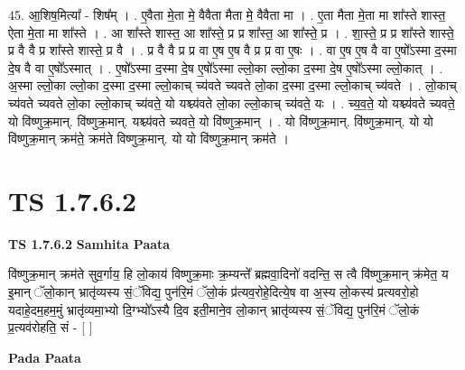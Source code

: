 \documentclass[17pt]{extarticle}
\begin{document}
45. आ॒शिष॒मित्या᳚ - शिष᳚म् । . ए॒वैता मे॒ता मे॒ वैवैता मैता मे॒ वैवैता मा । . ए॒ता मैता मे॒ता मा शा᳚स्ते शास्त॒ ऐता मे॒ता मा शा᳚स्ते । . आ शा᳚स्ते शास्त॒ आ शा᳚स्ते॒ प्र प्र शा᳚स्त॒ आ शा᳚स्ते॒ प्र । . शा॒स्ते॒ प्र प्र शा᳚स्ते शास्ते॒ प्र वै वै प्र शा᳚स्ते शास्ते॒ प्र वै । . प्र वै वै प्र प्र वा ए॒ष ए॒ष वै प्र प्र वा ए॒षः । . वा ए॒ष ए॒ष वै वा ए॒षो᳚ऽस्मा द॒स्मा दे॒ष वै वा ए॒षो᳚ऽस्मात् । . ए॒षो᳚ऽस्मा द॒स्मा दे॒ष ए॒षो᳚ऽस्मा ल्लो॒का ल्लो॒का द॒स्मा दे॒ष ए॒षो᳚ऽस्मा ल्लो॒कात् । . अ॒स्मा ल्लो॒का ल्लो॒का द॒स्मा द॒स्मा ल्लो॒काच् च्य॑वते च्यवते लो॒का द॒स्मा द॒स्मा ल्लो॒काच् च्य॑वते । . लो॒काच् च्य॑वते च्यवते लो॒का ल्लो॒काच् च्य॑वते॒ यो यश्च्य॑वते लो॒का ल्लो॒काच् च्य॑वते॒ यः । . च्य॒व॒ते॒ यो यश्च्य॑वते च्यवते॒ यो वि॑ष्णुक्र॒मान्. वि॑ष्णुक्र॒मान्. यश्च्य॑वते च्यवते॒ यो वि॑ष्णुक्र॒मान् । . यो वि॑ष्णुक्र॒मान्. वि॑ष्णुक्र॒मान्. यो यो वि॑ष्णुक्र॒मान् क्रम॑ते॒ क्रम॑ते विष्णुक्र॒मान्. यो यो वि॑ष्णुक्र॒मान् क्रम॑ते । \newline
\pagebreak
{}
\section*{ TS 1.7.6.2 }

\textbf{TS 1.7.6.2 } \newline
\textbf{Samhita Paata} \newline

वि॑ष्णुक्र॒मान् क्रम॑ते सुव॒र्गाय॒ हि लो॒काय॑ विष्णुक्र॒माः क्र॒म्यन्ते᳚ ब्रह्मवा॒दिनो॑ वदन्ति॒ स त्वै वि॑ष्णुक्र॒मान् क्र॑मेत॒ य इ॒मान् ॅलो॒कान् भ्रातृ॑व्यस्य सं॒ॅविद्य॒ पुन॑रि॒मं ॅलो॒कं प्र॑त्यव॒रोहे॒दित्ये॒ष वा अ॒स्य लो॒कस्य॑ प्रत्यवरो॒हो यदाहे॒दम॒हम॒मुं भ्रातृ॑व्यमा॒भ्यो दि॒ग्भ्यो᳚ऽस्यै दि॒व इती॒माने॒व लो॒कान् भ्रातृ॑व्यस्य सं॒ॅविद्य॒ पुन॑रि॒मं ॅलो॒कं प्र॒त्यव॑रोहति॒ सं - [ ] \newline

\textbf{Pada Paata} \newline
\end{document}
